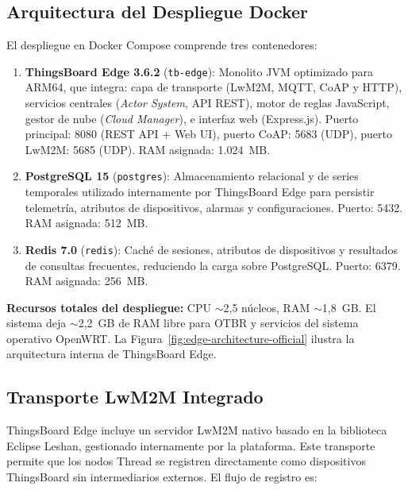 \subsection{Arquitectura del Despliegue Docker}
\label{sec:gateway-tb-edge-arquitectura}

El despliegue en Docker Compose comprende tres contenedores:

\begin{enumerate}
    \item \textbf{ThingsBoard Edge 3.6.2} (\texttt{tb-edge}): Monolito JVM optimizado para ARM64, que integra: capa de transporte (LwM2M, MQTT, CoAP y HTTP), servicios centrales (\emph{Actor System}, API REST), motor de reglas JavaScript, gestor de nube (\emph{Cloud Manager}), e interfaz web (Express.js).  Puerto principal: 8080 (REST API + Web UI), puerto CoAP: 5683 (UDP), puerto LwM2M: 5685 (UDP).  RAM asignada: 1.024~MB.

    \item \textbf{PostgreSQL 15} (\texttt{postgres}): Almacenamiento relacional y de series temporales utilizado internamente por ThingsBoard Edge para persistir telemetría, atributos de dispositivos, alarmas y configuraciones.  Puerto: 5432.  RAM asignada: 512~MB.

    \item \textbf{Redis 7.0} (\texttt{redis}): Caché de sesiones, atributos de dispositivos y resultados de consultas frecuentes, reduciendo la carga sobre PostgreSQL.  Puerto: 6379.  RAM asignada: 256~MB.
\end{enumerate}

\textbf{Recursos totales del despliegue:} CPU $\sim$2,5 núcleos, RAM $\sim$1,8~GB.  El sistema deja $\sim$2,2~GB de RAM libre para OTBR y servicios del sistema operativo OpenWRT.  La Figura~\ref{fig:edge-architecture-official} ilustra la arquitectura interna de ThingsBoard Edge.



\subsection{Transporte LwM2M Integrado}
\label{sec:gateway-tb-edge-lwm2m}

ThingsBoard Edge incluye un servidor LwM2M nativo basado en la biblioteca Eclipse Leshan, gestionado internamente por la plataforma.  Este transporte permite que los nodos Thread se registren directamente como dispositivos ThingsBoard sin intermediarios externos.  El flujo de registro es:


